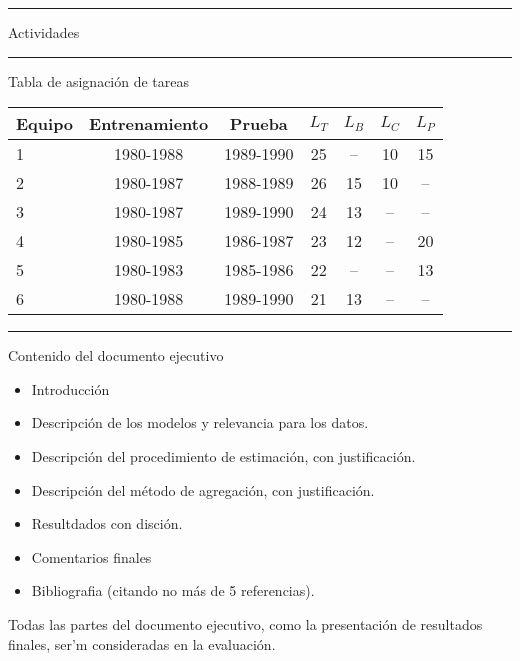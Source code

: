 \documentclass[10pt]{exam}
\begin{document}
\noindent
\rule[2ex]{\textwidth}{1pt}

\begin{center}
Actividades
\end{center}
\begin{questions}
\question 
\end{questions}

\newpage
\noindent
\rule[2ex]{\textwidth}{1pt}
\begin{center}
Tabla de asignaci\'on de tareas

\begin{tabular}{| l | c | c | c | c | c | c |}
\hline
Equipo & Entrenamiento & Prueba & $L_T$ & $L_B$ & $L_C$ & $L_P$ \\
\hline
\hline
1 & 1980-1988 & 1989-1990 & 25 & -- & 10 & 15 \\
2 & 1980-1987 & 1988-1989 & 26 & 15 & 10 & -- \\
3 & 1980-1987 & 1989-1990 & 24 & 13 & -- & -- \\
4 & 1980-1985 & 1986-1987 & 23 & 12 & -- & 20 \\
5 & 1980-1983 & 1985-1986 & 22 & -- & -- & 13 \\
6 & 1980-1988 & 1989-1990 & 21 & 13 & -- & -- \\
\hline
\end{tabular}
\end{center}

\rule[2ex]{\textwidth}{1pt}
\begin{center}
Contenido del documento ejecutivo
\end{center}

\begin{itemize}
\item Introducci\'on
\item Descripci\'on de los modelos y relevancia para los datos.
\item Descripci\'on del procedimiento de estimaci\'on, con justificaci\'on.
\item Descripci\'on del m\'etodo de agregaci\'on, con justificaci\'on.
\item Resultdados con disci\'on.
\item Comentarios finales
\item Bibliografia (citando no m\'as de 5 referencias).
\end{itemize}

\noindent
Todas las partes del documento ejecutivo, como la presentaci\'on de resultados finales, ser\a'm consideradas en la evaluaci\'on.
\end{document}
